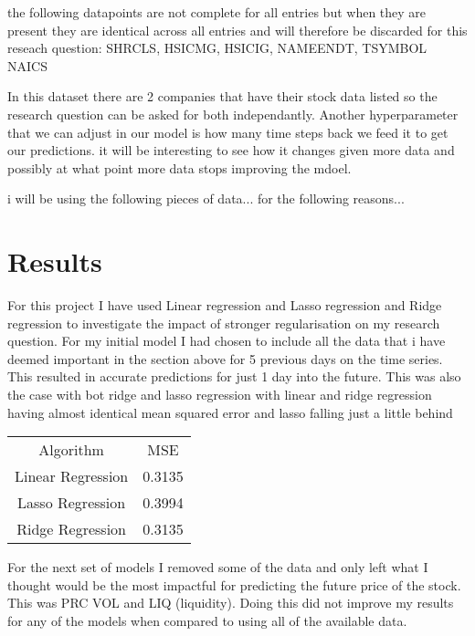 \documentclass{report}
\begin{document}
the following datapoints are not complete for all entries but when they are present they are identical across all entries and will therefore be discarded for this reseach question: SHRCLS, HSICMG, HSICIG, NAMEENDT, TSYMBOL NAICS

In this dataset there are 2 companies that have their stock data listed so the research question can be asked for both independantly. Another hyperparameter that we can adjust in our model is how many time steps back we feed it to get our predictions. it will be interesting to see how it changes given more data and possibly at what point more data stops improving the mdoel.


i will be using the following pieces of data...
for the following reasons...

\section{Results}

For this project I have used Linear regression and Lasso regression and Ridge regression to investigate the impact of stronger regularisation on my research question.
For my initial model I had chosen to include all the data that i have deemed important in the section above for 5 previous days on the time series. This resulted in accurate predictions for just 1 day into the future. This was also the case with bot ridge and lasso regression with linear and ridge regression having almost identical mean squared error and lasso falling just a little behind

\begin{minipage} {\linewidth}
\bigskip
\centering
{}
\begin{tabular}{c c}
    Algorithm & MSE \\
    Linear Regression & 0.3135 \\
    Lasso Regression & 0.3994 \\
    Ridge Regression & 0.3135
\end{tabular}
\bigskip
\end{minipage}

For the next set of models I removed some of the data and only left what I thought would be the most impactful for predicting the future price of the stock.
This was PRC VOL and LIQ (liquidity).
Doing this did not improve my results for any of the models when compared to using all of the available data.
\end{document}
